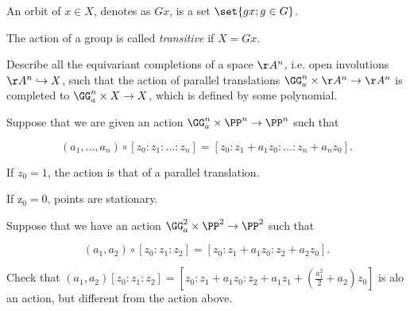 \documentclass[11pt]{scrartcl}
\begin{document}
  \begin{definition}
    An orbit of $x\in X$, denotes as $Gx$, is a set $\set{gx; g\in G}$.
  \end{definition}

  The action of a group is called \textit{transitive} if $X = Gx$.

  \begin{problem*}
    \hfill

    Describe all the equivariant completions of a space $\AA^{n}$,
    i.e. open involutions $\AA^{n} \hookrightarrow X$, such that the action of
    parallel translations $\GG_{a}^{n}\times \AA^{n} \to \AA^{n}$ is
    completed to $\GG_{a}^{n}\times X \to X$, which is defined by some
    polynomial.
  \end{problem*}

  \begin{example}

    Suppose that we are given an action
    $\GG_{a}^{n}\times \PP^{n} \to \PP^{n}$ such that
    
    \begin{equation*}
      (a_{1}, \dots, a_{n}) \circ [z_{0}:z_{1}:\dots:z_{n}] = [z_{0}: z_{1}+a_{1}z_{0}:\dots:z_{n}+a_{n}z_{0}].
    \end{equation*}

    If $z_{0} = 1$, the action is that of a parallel translation.

    If z$_{0} = 0$, points are stationary.
  \end{example}

  \begin{example}

    Suppose that we have an action
    $\GG_{a}^{2}\times \PP^{2} \to \PP^{2}$ such that

    \begin{equation*}
      (a_{1}, a_{2})\circ [z_{0}:z_{1}:z_{2}] = [z_{0}: z_{1}+a_{1}z_{0}:z_{2}+a_{2}z_{0}].
    \end{equation*}

    \begin{exercise}

      Check that
      $(a_{1}, a_{2})[z_{0}:z_{1}:z_{2}] =
      [z_{0}:z_{1}+a_{1}z_{0}:z_{2}+a_{1}z_{1}+(\frac{a_{1}^{2}}{2}+a_{2})z_{0}]$
      is alo an action, but different from the action above.

    \end{exercise}


  \end{example}
\end{document}
